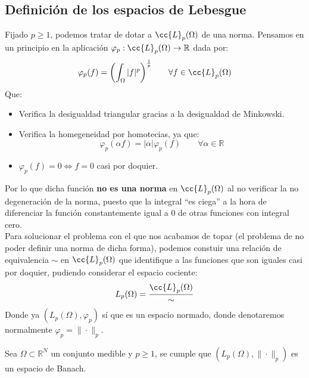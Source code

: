 \subsection{Definición de los espacios de Lebesgue}
Fijado $p\geq 1$, podemos tratar de dotar a $\cc{L}_p(\Omega)$ de una norma. Pensamos en un principio en la aplicación $\varphi_p:\cc{L}_p(\Omega)\to \mathbb{R}$ dada por:
\begin{equation*}
    \varphi_p(f) = {\left(\int_\Omega |f|^p\right)}^{\frac{1}{p}} \qquad \forall f\in \cc{L}_p(\Omega)
\end{equation*}
Que:
\begin{itemize}
    \item Verifica la desigualdad triangular gracias a la desigualdad de Minkowski.
    \item Verifica la homegeneidad por homotecias, ya que:
        \begin{equation*}
            \varphi_p(\alpha f) = |\alpha| \varphi_p(f) \qquad \forall \alpha\in \mathbb{R}
        \end{equation*}
    \item $\varphi_p(f) = 0 \Longleftrightarrow f = 0$ casi por doquier.
\end{itemize}
Por lo que dicha función \textbf{no es una norma} en $\cc{L}_p(\Omega)$ al no verificar la no degeneración de la norma, puesto que la integral ``es ciega'' a la hora de diferenciar la función constantemente igual a 0 de otras funciones con integral cero.\\

\noindent
Para solucionar el problema con el que nos acabamos de topar (el problema de no poder definir una norma de dicha forma), podemos constuir una relación de equivalencia $\sim$ en $\cc{L}_p(\Omega)$ que identifique a las funciones que son iguales casi por doquier, pudiendo considerar el espacio cociente:
\begin{equation*}
    L_p(\Omega)= \dfrac{\cc{L}_p(\Omega)}{\sim}
\end{equation*}
Donde ya $(L_p(\Omega), \varphi_p)$ sí que es un espacio normado, donde denotaremos normalmente $\varphi_p = \|\cdot \|_p$.

\begin{teo}
    Sea $\Omega\subset \mathbb{R}^N$ un conjunto medible y $p\geq 1$, se cumple que $(L_p(\Omega), \|\cdot \|_p)$ es un espacio de Banach.
\end{teo}

